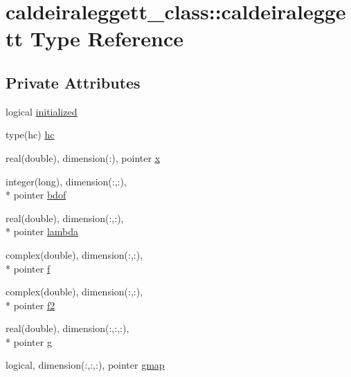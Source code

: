 \hypertarget{structcaldeiraleggett__class_1_1caldeiraleggett}{\section{caldeiraleggett\+\_\+class\+:\+:caldeiraleggett Type Reference}
\label{structcaldeiraleggett__class_1_1caldeiraleggett}
}
\subsection*{Private Attributes}
\begin{DoxyCompactItemize}
\item 
logical \hyperlink{structcaldeiraleggett__class_1_1caldeiraleggett_a63153086bccae7f9bf72caf7642760d2}{initialized}
\item 
type(hc) \hyperlink{structcaldeiraleggett__class_1_1caldeiraleggett_ad1967160344bac884ace13f141dc9705}{hc}
\item 
real(double), dimension(\+:), pointer \hyperlink{structcaldeiraleggett__class_1_1caldeiraleggett_a52f7919bcbd717bea7a549b320238a81}{x}
\item 
integer(long), dimension(\+:,\+:), \\*
pointer \hyperlink{structcaldeiraleggett__class_1_1caldeiraleggett_ae73736903071df5ae9de6030167b9dab}{bdof}
\item 
real(double), dimension(\+:,\+:), \\*
pointer \hyperlink{structcaldeiraleggett__class_1_1caldeiraleggett_a60bf2cdb86aa86ef3da5944357458180}{lambda}
\item 
complex(double), dimension(\+:,\+:), \\*
pointer \hyperlink{structcaldeiraleggett__class_1_1caldeiraleggett_a6bddd7a6456f7af20b78fc953f8a6f8d}{f}
\item 
complex(double), dimension(\+:,\+:), \\*
pointer \hyperlink{structcaldeiraleggett__class_1_1caldeiraleggett_a3259a277246cdeb1edd681e8e228cf65}{f2}
\item 
real(double), dimension(\+:,\+:,\+:), \\*
pointer \hyperlink{structcaldeiraleggett__class_1_1caldeiraleggett_a1c56aab46485d9a0253498e033242d08}{g}
\item 
logical, dimension(\+:,\+:,\+:), pointer \hyperlink{structcaldeiraleggett__class_1_1caldeiraleggett_a33cf55b81ce7edcfa882440ebd220e41}{gmap}
\end{DoxyCompactItemize}


